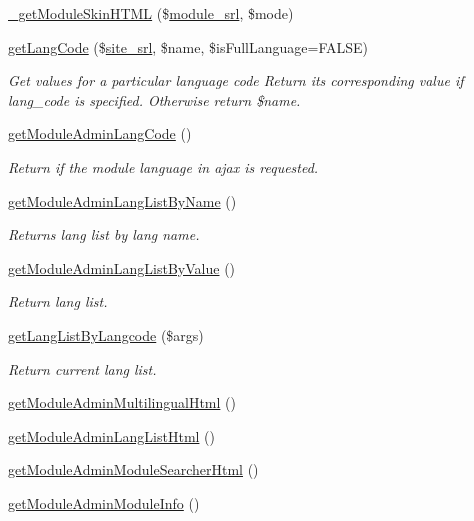 \begin{DoxyCompactItemize}
\item 
\hyperlink{classmoduleAdminModel_ac69c4e024dcabbcaa3f7a13a4c61af04}{\+\_\+get\+Module\+Skin\+H\+T\+M\+L} (\$\hyperlink{ko_8install_8php_a370bb6450fab1da3e0ed9f484a38b761}{module\+\_\+srl}, \$mode)
\item 
\hyperlink{classmoduleAdminModel_aa10dc8b8645165816c43f140c57b546b}{get\+Lang\+Code} (\$\hyperlink{ko_8install_8php_a8b1406b4ad1048041558dce6bfe89004}{site\+\_\+srl}, \$name, \$is\+Full\+Language=F\+A\+L\+S\+E)
\begin{DoxyCompactList}\small\item\em Get values for a particular language code Return its corresponding value if lang\+\_\+code is specified. Otherwise return \$name. \end{DoxyCompactList}\item 
\hyperlink{classmoduleAdminModel_a783b7e9e5a0db68d0eb782fff6f7e461}{get\+Module\+Admin\+Lang\+Code} ()
\begin{DoxyCompactList}\small\item\em Return if the module language in ajax is requested. \end{DoxyCompactList}\item 
\hyperlink{classmoduleAdminModel_ab5982d758fb39c6d56c41af9827845cf}{get\+Module\+Admin\+Lang\+List\+By\+Name} ()
\begin{DoxyCompactList}\small\item\em Returns lang list by lang name. \end{DoxyCompactList}\item 
\hyperlink{classmoduleAdminModel_acd8e42367271f853d4da4388fe15b0d1}{get\+Module\+Admin\+Lang\+List\+By\+Value} ()
\begin{DoxyCompactList}\small\item\em Return lang list. \end{DoxyCompactList}\item 
\hyperlink{classmoduleAdminModel_a425b28af6d0f27c2306191d7a4abdbaa}{get\+Lang\+List\+By\+Langcode} (\$args)
\begin{DoxyCompactList}\small\item\em Return current lang list. \end{DoxyCompactList}\item 
\hyperlink{classmoduleAdminModel_a51568f16c761da74a811fe599970ea0f}{get\+Module\+Admin\+Multilingual\+Html} ()
\item 
\hyperlink{classmoduleAdminModel_a1f3f518448a54604d56032927b4ef957}{get\+Module\+Admin\+Lang\+List\+Html} ()
\item 
\hyperlink{classmoduleAdminModel_aca064d49155437d5cad912d1f885933f}{get\+Module\+Admin\+Module\+Searcher\+Html} ()
\item 
\hyperlink{classmoduleAdminModel_a205c97c3919ee573047431c8c2a0e1a7}{get\+Module\+Admin\+Module\+Info} ()
\end{DoxyCompactItemize}
